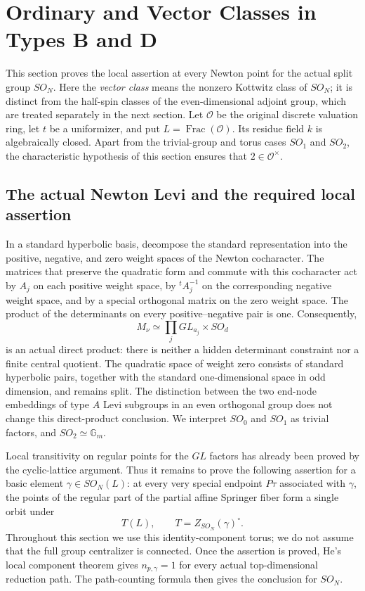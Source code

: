 \documentclass[11pt,a4paper]{article}
\theoremstyle{definition}
\theoremstyle{remark}
\begin{document}
\section{Ordinary and Vector Classes in Types B and D}\label{sec:so}

This section proves the local assertion at every Newton point for the actual
split group \(SO_N\). Here the \emph{vector class} means the nonzero Kottwitz
class of \(SO_N\); it is distinct from the half-spin classes of the
even-dimensional adjoint group, which are treated separately in the next
section. Let \(\mathcal O\) be the original discrete valuation ring, let \(t\)
be a uniformizer, and put \(L=\operatorname{Frac}(\mathcal O)\). Its residue
field \(k\) is algebraically closed. Apart from the trivial-group and torus
cases \(SO_1\) and \(SO_2\), the characteristic hypothesis of this section
ensures that \(2\in\mathcal O^\times\).

\subsection{The actual Newton Levi and the required local assertion}
\label{subsec:so-newton-levi}

In a standard hyperbolic basis, decompose the standard representation into
the positive, negative, and zero weight spaces of the Newton cocharacter.
The matrices that preserve the quadratic form and commute with this
cocharacter act by \(A_j\) on each positive weight space, by
\({}^tA_j^{-1}\) on the corresponding negative weight space, and by a special
orthogonal matrix on the zero weight space. The product of the determinants
on every positive--negative pair is one. Consequently,
\[
 M_\nu\simeq\prod_j GL_{a_j}\times SO_d
\]
is an actual direct product: there is neither a hidden determinant
constraint nor a finite central quotient. The quadratic space of weight
zero consists of standard hyperbolic pairs, together with the standard
one-dimensional space in odd dimension, and remains split. The distinction
between the two end-node embeddings of type \(A\) Levi subgroups in an even
orthogonal group does not change this direct-product conclusion. We
interpret \(SO_0\) and \(SO_1\) as trivial factors, and
\(SO_2\simeq\mathbb G_m\).

Local transitivity on regular points for the \(GL\) factors has already
been proved by the cyclic-lattice argument. Thus it remains to prove the
following assertion for a basic element \(\gamma\in SO_N(L)\): at every
very special endpoint \(P\tau\) associated with \(\gamma\), the points of the
regular part of the partial affine Springer fiber form a single orbit
under
\[
 T(L),\qquad T=Z_{SO_N}(\gamma)^\circ.
\]
Throughout this section we use this identity-component torus; we do not
assume that the full group centralizer is connected. Once the assertion is
proved, He's local component theorem gives \(n_{p,\gamma}=1\) for every
actual top-dimensional reduction path. The path-counting formula then
gives the conclusion for \(SO_N\).
\end{document}
